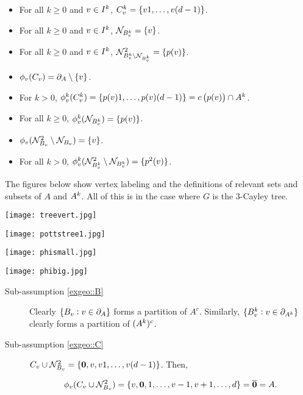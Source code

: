 \begin{description}
\begin{itemize}
\item For all \(k \geq 0\) and \(v \in I^{k}\), \(C^{k}_v = \{v1,\dots,v(d-1)\}\). 

\item For all \(k \geq 0\) and \(v \in I^{k}\), \(\mathcal{N}_{B^{k}_v} = \{v\}\). 

\item For all \(k \geq 0\) and \(v \in I^{k}\), \(\mathcal{N}^2_{B^{k}_v\setminus\mathcal{N}_{B^{k}_v}} = \{p(v)\}\). 

\item \(\phi_v(C_v) = \partial_{A}\setminus\{v\}\).

\item For \(k > 0\), \(\phi^{k}_v(C^{k}_v) = \{p(v)1,\dots,p(v)(d-1)\} = c\left(p(v)\right)\cap A^{k}\).

\item For all \(k \geq 0\), \(\phi^{k}_v(\mathcal{N}_{B^{k}_v}) = \{p(v)\}\).

\item \(\phi_v(\mathcal{N}^2_{B_v}\setminus\mathcal{N}_{B_v}) = \{v\}\).

\item For all \(k > 0\), \(\phi^{k}_v(\mathcal{N}^2_{B^{k}_v}\setminus\mathcal{N}_{B^{k}_v}) = \{p^2(v)\}\).
\end{itemize}

The figures below show vertex labeling and the definitions of relevant sets and subsets of \(A\) and \(A^{k}\). All of this is in the case where \(G\) is the \(3\)-Cayley tree.

\texttt{[image: treevert.jpg]}

\texttt{[image: pottstree1.jpg]}

\texttt{[image: phismall.jpg]}

\texttt{[image: phibig.jpg]}


\begin{description}
\item[Sub-assumption \ref{exgeo::B}] Clearly \(\{B_v: v\in \partial_{A}\}\) forms a partition of \(A^c\). Similarly, \(\{B^{k}_v: v\in \partial_{A^{k}}\}\) clearly forms a partition of \((A^{k})^c\).

\item[Sub-assumption \ref{exgeo::C}] \(C_v\cup\mathcal{N}^2_{B_v} = \{\mathbf{0},v,v1,\dots,v(d-1)\}\). Then,

\[\phi_v(C_v\cup\mathcal{N}^2_{B_v}) = \{v,\mathbf{0},1,\dots,v-1,v+1,\dots,d\} = \overline{\mathbf{0}} = A.\]


\end{description}
\end{description}
